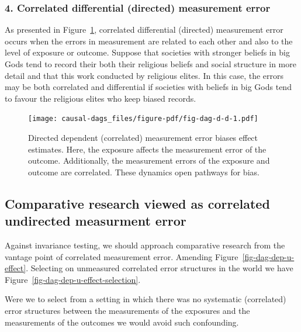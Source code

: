 \documentclass[
  singlecolumn]{report}
\begin{document}
\hypertarget{correlated-differential-directed-measurement-error}{%
\subsubsection{\texorpdfstring{4. \textbf{Correlated differential
(directed) measurement
error}}{4. Correlated differential (directed) measurement error}}\label{correlated-differential-directed-measurement-error}}

As presented in Figure~\ref{fig-dag-d-d}, correlated differential
(directed) measurement error occurs when the errors in measurement are
related to each other and also to the level of exposure or outcome.
Suppose that societies with stronger beliefs in big Gods tend to record
their both their religious beliefs and social structure in more detail
and that this work conducted by religious elites. In this case, the
errors may be both correlated and differential if societies with beliefs
in big Gods tend to favour the religious elites who keep biased records.

\begin{figure}

{\centering \texttt{[image: causal-dags\_files/figure-pdf/fig-dag-d-d-1.pdf]}

}

\caption{\label{fig-dag-d-d}Directed dependent (correlated) measurement
error biases effect estimates. Here, the exposure affects the
measurement error of the outcome. Additionally, the measurement errors
of the exposure and outcome are correlated. These dynamics open pathways
for bias.}

\end{figure}

\hypertarget{comparative-research-viewed-as-correlated-undirected-measurment-error}{%
\subsection{Comparative research viewed as correlated undirected
measurment
error}\label{comparative-research-viewed-as-correlated-undirected-measurment-error}}

Against invariance testing, we should approach comparative research from
the vantage point of correlated measurement error. Amending
Figure~\ref{fig-dag-dep-u-effect}. Selecting on unmeasured correlated
error structures in the world we have
Figure~\ref{fig-dag-dep-u-effect-selection}.

Were we to select from a setting in which there was no systematic
(correlated) error structures between the measurements of the exposures
and the measurements of the outcomes we would avoid such confounding.
\end{document}
